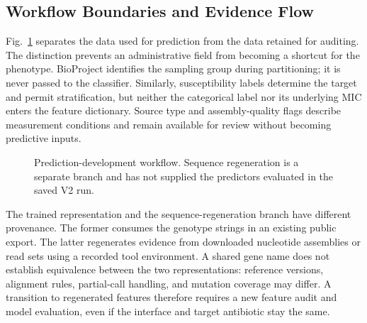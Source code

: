\subsection{Workflow Boundaries and Evidence Flow}
Fig.~\ref{fig:workflow} separates the data used for prediction from the data retained for auditing. The distinction prevents an administrative field from becoming a shortcut for the phenotype. BioProject identifies the sampling group during partitioning; it is never passed to the classifier. Similarly, susceptibility labels determine the target and permit stratification, but neither the categorical label nor its underlying MIC enters the feature dictionary. Source type and assembly-quality flags describe measurement conditions and remain available for review without becoming predictive inputs.

\begin{figure}[t]
\centering
{}
\caption{Prediction-development workflow. Sequence regeneration is a separate branch and has not supplied the predictors evaluated in the saved V2 run.}
\label{fig:workflow}
\end{figure}

The trained representation and the sequence-regeneration branch have different provenance. The former consumes the genotype strings in an existing public export. The latter regenerates evidence from downloaded nucleotide assemblies or read sets using a recorded tool environment. A shared gene name does not establish equivalence between the two representations: reference versions, alignment rules, partial-call handling, and mutation coverage may differ. A transition to regenerated features therefore requires a new feature audit and model evaluation, even if the interface and target antibiotic stay the same.


